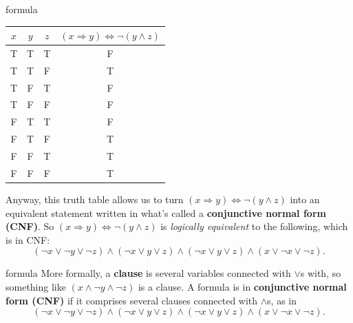 \documentclass{beamer}
\begin{document}
\begin{frame}{formula}
\begin{center}
\begin{tabular}{|c|c|c|c|}
\hline
$x$ & $y$ & $z$ & $(x \Rightarrow y) \Leftrightarrow \neg (y \land z)$\\
\hline
T & T & T & F\\
\hline
T & T & F & T\\
\hline
T & F & T & F\\
\hline
T & F & F & F\\
\hline
F & T & T & F\\
\hline
F & T & F & T\\
\hline
F & F & T & T\\
\hline
F & F & F & T\\
\hline
\end{tabular}
\end{center}
Anyway, this truth table allows us to turn $(x \Rightarrow y) \Leftrightarrow \neg (y \land z)$ into an equivalent statement written in what's called a \textbf{conjunctive normal form (CNF)}. So $(x \Rightarrow y) \Leftrightarrow \neg (y \land z)$ is \textit{logically equivalent} to the following, which is in CNF:
$$(\neg x \lor \neg y \lor \neg z) \land (\neg x \lor y \lor z) \land (\neg x \lor y \lor z) \land (x \lor \neg x \lor \neg z).$$
\end{frame}

\begin{frame}{formula}
More formally, a \textbf{clause} is several variables connected with $\lor$s with, so something like $(x \land \neg y \land \neg z)$ is a clause. A formula is in \textbf{conjunctive normal form (CNF)} if it comprises several clauses connected with $\land$s, as in 
$$(\neg x \lor \neg y \lor \neg z) \land (\neg x \lor y \lor z) \land (\neg x \lor y \lor z) \land (x \lor \neg x \lor \neg z).$$
\end{frame}
\end{document}
